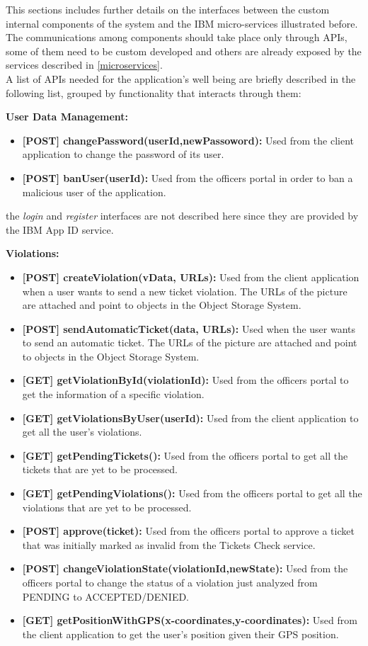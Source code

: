 This sections includes further details on the interfaces between the custom internal components of the system and the IBM micro-services illustrated before. The communications among components should take place only through APIs, some of them need to be custom developed and others are already exposed by the services described in \ref{microservices}.
\\ A list of APIs needed for the application's well being are briefly described in the following list, grouped by functionality that interacts through them:

\textbf{User Data Management:}
\begin{itemize}
	\item \textbf{[POST] changePassword(userId,newPassoword):} Used from the client application to change the password of its user.
	\item \textbf{[POST] banUser(userId):} Used from the officers portal in order to ban a malicious user of the application.
\end{itemize}
the \textit{login} and \textit{register} interfaces are not described here since they are provided by the IBM App ID service.

\textbf{Violations:}
\begin{itemize}
	\item \textbf{[POST] createViolation(vData, URLs):} Used from the client application when a user wants to send a new ticket violation. The URLs of the picture are attached and point to objects in the Object Storage System.
	\item \textbf{[POST] sendAutomaticTicket(data, URLs):} Used when the user wants to send an automatic ticket. The URLs of the picture are attached and point to objects in the Object Storage System.
	\item \textbf{[GET] getViolationById(violationId):} Used from the officers portal to get the information of a specific violation.
	\item \textbf{[GET] getViolationsByUser(userId):} Used from the client application to get all the user's violations.
	\item \textbf{[GET]	getPendingTickets():} Used from the officers portal to get all the tickets that are yet to be processed.
	\item \textbf{[GET]	getPendingViolations():} Used from the officers portal to get all the violations that are yet to be processed.
	\item \textbf{[POST] approve(ticket):} Used from the officers portal to approve a ticket that was initially marked as invalid from the Tickets Check service.
	\item \textbf{[POST] changeViolationState(violationId,newState):} Used from the officers portal to change the status of a violation just analyzed from PENDING to ACCEPTED/DENIED.
	\item \textbf{[GET] getPositionWithGPS(x-coordinates,y-coordinates):} Used from the client application to get the user's position given their GPS position.
\end{itemize}

